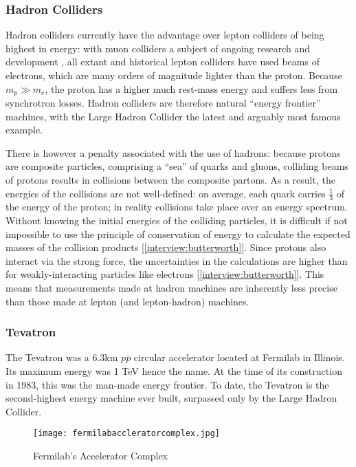 \subsubsection{Hadron Colliders}
Hadron colliders currently have the advantage over lepton colliders of being highest in energy: with muon colliders a subject of ongoing research and development \cite{Fermi:Muon:Online}, all extant and historical lepton colliders have used beams of electrons, which are many orders of magnitude lighter than the proton. Because $m_{p}\gg m_{e}$, the proton has a higher much rest-mass energy and suffers less from synchrotron losses. Hadron colliders are therefore natural ``energy frontier'' machines, with the Large Hadron Collider the latest and arguably most famous example.

There is however a penalty associated with the use of hadrons: because protons are composite particles, comprising a ``sea'' of quarks and gluons, colliding beams of protons results in collisions between the composite partons. As a result, the energies of the collisions are not well-defined: on average, each quark carries $\frac{1}{3}$ of the energy of the proton; in reality collisions take place over an energy spectrum. Without knowing the initial energies of the colliding particles, it is difficult \textendash if not impossible \textendash to use the principle of conservation of energy to calculate the expected masses of the collision products [\ref{interview:butterworth}]. Since protons also interact via the strong force, the uncertainties in the calculations are higher than for weakly-interacting particles like electrons [\ref{interview:butterworth}]. This means that measurements made at hadron machines are inherently less precise than those made at lepton (and lepton-hadron) machines.
\subsubsection{Tevatron}
The Tevatron was a 6.3km $p\overline{p}$ circular accelerator located at Fermilab in Illinois. Its maximum energy was 1 TeV \textendash hence the name. At the time of its construction in 1983, this was the man-made energy frontier. To date, the Tevatron is the second-highest energy machine ever built, surpassed only by the Large Hadron Collider.

\begin{figure}[!htb]
\centering
\texttt{[image: fermilabaccleratorcomplex.jpg]}
\caption{Fermilab's Accelerator Complex \cite{Tevatron:Antiprotons:Online}}
\end{figure}

